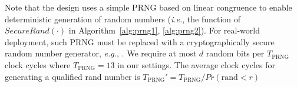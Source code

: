\documentclass[runningheads]{llncs}
\begin{document}

Note that the design uses a simple PRNG based on linear congruence to enable deterministic generation of random numbers (\textit{i.e.}, the function of $SecureRand(\cdot)$ in Algorithm~\ref{alg:prng1}, \ref{alg:prng2}). For real-world deployment,
such PRNG must be replaced with a cryptographically secure random number
generator, \textit{e.g.}, \cite{laue2007compact,cherkaoui2013very}. We require at most $d$ random bits per $T_{\text{PRNG}}$ clock cycles where $T_{\text{PRNG}}=13$ in our settings.
The average clock cycles for generating a qualified rand number is $T_{\text{PRNG}}' = T_{\text{PRNG}}/Pr(\text{rand} < r)$

%
\end{document}
